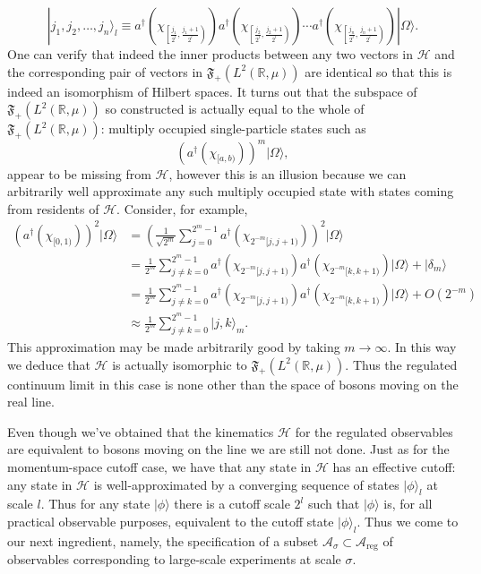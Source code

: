 \documentclass[11pt]{amsart}
\theoremstyle{plain}%
\theoremstyle{definition}
\theoremstyle{remark}
\begin{document}
\begin{equation}
	 |j_1,j_2, \ldots, j_n\rangle_l \equiv a^\dag\left(\chi_{\left[\frac{j_1}{2^l}, \frac{j_1+1}{2^l}\right)}\right)a^\dag\left(\chi_{\left[\frac{j_2}{2^l}, \frac{j_2+1}{2^l}\right)}\right)\cdots a^\dag\left(\chi_{\left[\frac{j_n}{2^l}, \frac{j_n+1}{2^l}\right)}\right)|\Omega\rangle.
\end{equation} 
One can verify that indeed the inner products between any two vectors in $\mathcal{H}$ and the corresponding pair of vectors in $\mathfrak{F}_+(L^2(\mathbb{R}, \mu))$ are identical so that this is indeed an isomorphism of Hilbert spaces. It turns out that the subspace of $\mathfrak{F}_+(L^2(\mathbb{R}, \mu))$ so constructed is actually equal to the whole of $\mathfrak{F}_+(L^2(\mathbb{R}, \mu))$: multiply occupied single-particle states such as 
\begin{equation}
	(a^\dag(\chi_{[a,b)}))^m |\Omega\rangle,
\end{equation}
appear to be missing from $\mathcal{H}$, however this is an illusion because we can arbitrarily well approximate any such multiply occupied state with states coming from residents of $\mathcal{H}$. Consider, for example,
\begin{equation}
	\begin{split}
		(a^\dag(\chi_{[0,1)}))^2 |\Omega\rangle &= \left(\frac{1}{\sqrt{2^m}}\sum_{j=0}^{2^m -1} a^\dag(\chi_{2^{-m}[j,j+1)}) \right)^2|\Omega\rangle \\
		&= \frac{1}{{2^m}}\sum_{j\not=k=0}^{2^m -1} a^\dag(\chi_{2^{-m}[j,j+1)})a^\dag(\chi_{2^{-m}[k,k+1)})|\Omega\rangle + |\delta_m\rangle \\
		&= \frac{1}{{2^m}}\sum_{j\not=k=0}^{2^m -1} a^\dag(\chi_{2^{-m}[j,j+1)})a^\dag(\chi_{2^{-m}[k,k+1)})|\Omega\rangle + O(2^{-m}) \\
		&\approx \frac{1}{{2^m}}\sum_{j\not=k=0}^{2^m -1} |j,k\rangle_m.
	\end{split}
\end{equation}
This approximation may be made arbitrarily good by taking $m\rightarrow \infty$. In this way we deduce that $\mathcal{H}$ is actually isomorphic to $\mathfrak{F}_+(L^2(\mathbb{R}, \mu))$. Thus the regulated continuum limit in this case is none other than the space of bosons moving on the real line. 

Even though we've obtained that the kinematics $\mathcal{H}$ for the regulated observables are equivalent to bosons moving on the line we are still not done. Just as for the momentum-space cutoff case, we have that any state in $\mathcal{H}$ has an effective cutoff: any state in $\mathcal{H}$ is well-approximated by a converging sequence of states $|\phi\rangle_l$ at scale $l$. Thus for any state $|\phi\rangle$ there is a cutoff scale $2^l$ such that $|\phi\rangle$ is, for all practical observable purposes, equivalent to the cutoff state $|\phi\rangle_l$. Thus we come to our next ingredient, namely, the specification of a subset $\mathcal{A}_\sigma \subset \mathcal{A}_{\text{reg}}$ of observables corresponding to large-scale experiments at scale $\sigma$. 
\end{document}
